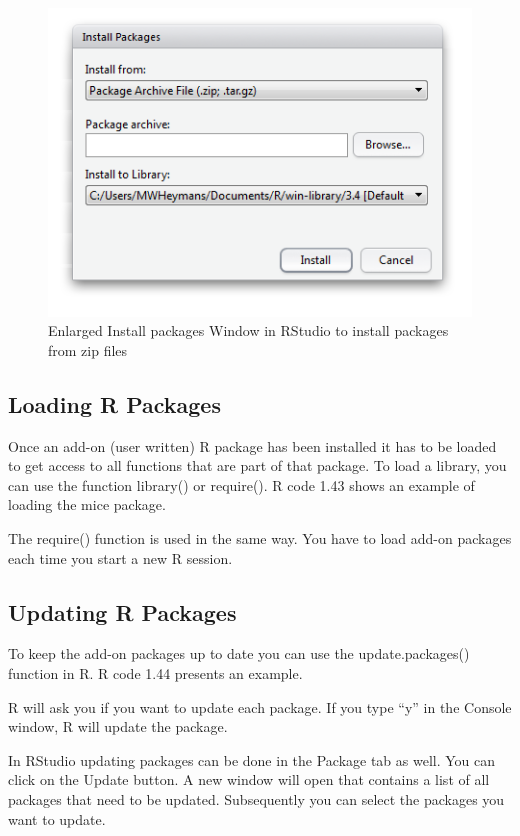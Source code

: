 \documentclass[]{book}
\begin{document}
\begin{figure}

{\centering \includegraphics[width=0.9\linewidth]{images/fig1.26b} 

}

\caption{Enlarged Install packages Window in RStudio to install packages from zip files}\label{fig:fig26b}
\end{figure}

\subsection{Loading R Packages}\label{loading-r-packages}

Once an add-on (user written) R package has been installed it has to be
loaded to get access to all functions that are part of that package. To
load a library, you can use the function library() or require(). R code
1.43 shows an example of loading the mice package.

The require() function is used in the same way. You have to load add-on
packages each time you start a new R session.

\subsection{Updating R Packages}\label{updating-r-packages}

To keep the add-on packages up to date you can use the update.packages()
function in R. R code 1.44 presents an example.

R will ask you if you want to update each package. If you type ``y'' in
the Console window, R will update the package.

In RStudio updating packages can be done in the Package tab as well. You
can click on the Update button. A new window will open that contains a
list of all packages that need to be updated. Subsequently you can
select the packages you want to update.
\end{document}
